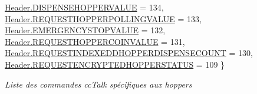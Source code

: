 \begin{DoxyCompactItemize}
\mbox{\hyperlink{group___header_ggab8e15517b29b9562c7d7e8616d61c855a3f0803c91adce917551e3653ce6ab02b}{Header.\+D\+I\+S\+P\+E\+N\+S\+E\+H\+O\+P\+P\+E\+R\+V\+A\+L\+UE}} = 134, 
\mbox{\hyperlink{group___header_ggab8e15517b29b9562c7d7e8616d61c855af4cf967e4b4c084bb9148099781b3a49}{Header.\+R\+E\+Q\+U\+E\+S\+T\+H\+O\+P\+P\+E\+R\+P\+O\+L\+L\+I\+N\+G\+V\+A\+L\+UE}} = 133, 
\mbox{\hyperlink{group___header_ggab8e15517b29b9562c7d7e8616d61c855ab7f6a886cf52347442b934ad59273c7d}{Header.\+E\+M\+E\+R\+G\+E\+N\+C\+Y\+S\+T\+O\+P\+V\+A\+L\+UE}} = 132, 
\newline
\mbox{\hyperlink{group___header_ggab8e15517b29b9562c7d7e8616d61c855a6ad8e7feb8e305d7b549b257c70d3ddf}{Header.\+R\+E\+Q\+U\+E\+S\+T\+H\+O\+P\+P\+E\+R\+C\+O\+I\+N\+V\+A\+L\+UE}} = 131, 
\mbox{\hyperlink{group___header_ggab8e15517b29b9562c7d7e8616d61c855a954b2d7e92fb3c676e4246f551a03871}{Header.\+R\+E\+Q\+U\+E\+S\+T\+I\+N\+D\+E\+X\+E\+D\+D\+H\+O\+P\+P\+E\+R\+D\+I\+S\+P\+E\+N\+S\+E\+C\+O\+U\+NT}} = 130, 
\mbox{\hyperlink{group___header_ggab8e15517b29b9562c7d7e8616d61c855aa0d004c8327a3e8b0ae5165246991c25}{Header.\+R\+E\+Q\+U\+E\+S\+T\+E\+N\+C\+R\+Y\+P\+T\+E\+D\+H\+O\+P\+P\+E\+R\+S\+T\+A\+T\+US}} = 109
 \}
\begin{DoxyCompactList}\small\item\em Liste des commandes cc\+Talk spécifiques aux hoppers \end{DoxyCompactList}\end{DoxyCompactItemize}
